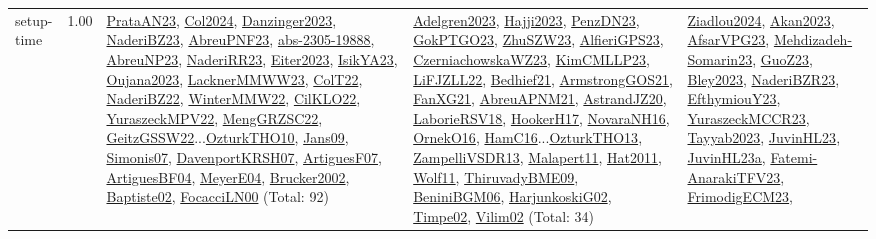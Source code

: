 {\begin{longtable}{p{3cm}r>{\raggedright\arraybackslash}p{6cm}>{\raggedright\arraybackslash}p{6cm}>{\raggedright\arraybackslash}p{8cm}}
\index{setup-time}\index{Concepts!setup-time}setup-time &  1.00 & \hyperref[detail:PrataAN23]{PrataAN23}, \hyperref[detail:Col2024]{Col2024}, \hyperref[detail:Danzinger2023]{Danzinger2023}, \hyperref[detail:NaderiBZ23]{NaderiBZ23}, \hyperref[detail:AbreuPNF23]{AbreuPNF23}, \hyperref[detail:abs-2305-19888]{abs-2305-19888}, \hyperref[detail:AbreuNP23]{AbreuNP23}, \hyperref[detail:NaderiRR23]{NaderiRR23}, \hyperref[detail:Eiter2023]{Eiter2023}, \hyperref[detail:IsikYA23]{IsikYA23}, \hyperref[detail:Oujana2023]{Oujana2023}, \hyperref[detail:LacknerMMWW23]{LacknerMMWW23}, \hyperref[detail:ColT22]{ColT22}, \hyperref[detail:NaderiBZ22]{NaderiBZ22}, \hyperref[detail:WinterMMW22]{WinterMMW22}, \hyperref[detail:CilKLO22]{CilKLO22}, \hyperref[detail:YuraszeckMPV22]{YuraszeckMPV22}, \hyperref[detail:MengGRZSC22]{MengGRZSC22}, \hyperref[detail:GeitzGSSW22]{GeitzGSSW22}...\hyperref[detail:OzturkTHO10]{OzturkTHO10}, \hyperref[detail:Jans09]{Jans09}, \hyperref[detail:Simonis07]{Simonis07}, \hyperref[detail:DavenportKRSH07]{DavenportKRSH07}, \hyperref[detail:ArtiguesF07]{ArtiguesF07}, \hyperref[detail:ArtiguesBF04]{ArtiguesBF04}, \hyperref[detail:MeyerE04]{MeyerE04}, \hyperref[detail:Brucker2002]{Brucker2002}, \hyperref[detail:Baptiste02]{Baptiste02}, \hyperref[detail:FocacciLN00]{FocacciLN00} (Total: 92) & \hyperref[detail:Adelgren2023]{Adelgren2023}, \hyperref[detail:Hajji2023]{Hajji2023}, \hyperref[detail:PenzDN23]{PenzDN23}, \hyperref[detail:GokPTGO23]{GokPTGO23}, \hyperref[detail:ZhuSZW23]{ZhuSZW23}, \hyperref[detail:AlfieriGPS23]{AlfieriGPS23}, \hyperref[detail:CzerniachowskaWZ23]{CzerniachowskaWZ23}, \hyperref[detail:KimCMLLP23]{KimCMLLP23}, \hyperref[detail:LiFJZLL22]{LiFJZLL22}, \hyperref[detail:Bedhief21]{Bedhief21}, \hyperref[detail:ArmstrongGOS21]{ArmstrongGOS21}, \hyperref[detail:FanXG21]{FanXG21}, \hyperref[detail:AbreuAPNM21]{AbreuAPNM21}, \hyperref[detail:AstrandJZ20]{AstrandJZ20}, \hyperref[detail:LaborieRSV18]{LaborieRSV18}, \hyperref[detail:HookerH17]{HookerH17}, \hyperref[detail:NovaraNH16]{NovaraNH16}, \hyperref[detail:OrnekO16]{OrnekO16}, \hyperref[detail:HamC16]{HamC16}...\hyperref[detail:OzturkTHO13]{OzturkTHO13}, \hyperref[detail:ZampelliVSDR13]{ZampelliVSDR13}, \hyperref[detail:Malapert11]{Malapert11}, \hyperref[detail:Hat2011]{Hat2011}, \hyperref[detail:Wolf11]{Wolf11}, \hyperref[detail:ThiruvadyBME09]{ThiruvadyBME09}, \hyperref[detail:BeniniBGM06]{BeniniBGM06}, \hyperref[detail:HarjunkoskiG02]{HarjunkoskiG02}, \hyperref[detail:Timpe02]{Timpe02}, \hyperref[detail:Vilim02]{Vilim02} (Total: 34) & \hyperref[detail:Ziadlou2024]{Ziadlou2024}, \hyperref[detail:Akan2023]{Akan2023}, \hyperref[detail:AfsarVPG23]{AfsarVPG23}, \hyperref[detail:Mehdizadeh-Somarin23]{Mehdizadeh-Somarin23}, \hyperref[detail:GuoZ23]{GuoZ23}, \hyperref[detail:Bley2023]{Bley2023}, \hyperref[detail:NaderiBZR23]{NaderiBZR23}, \hyperref[detail:EfthymiouY23]{EfthymiouY23}, \hyperref[detail:YuraszeckMCCR23]{YuraszeckMCCR23}, \hyperref[detail:Tayyab2023]{Tayyab2023}, \hyperref[detail:JuvinHL23]{JuvinHL23}, \hyperref[detail:JuvinHL23a]{JuvinHL23a}, \hyperref[detail:Fatemi-AnarakiTFV23]{Fatemi-AnarakiTFV23}, \hyperref[detail:FrimodigECM23]{FrimodigECM23}, 
\end{longtable}}
